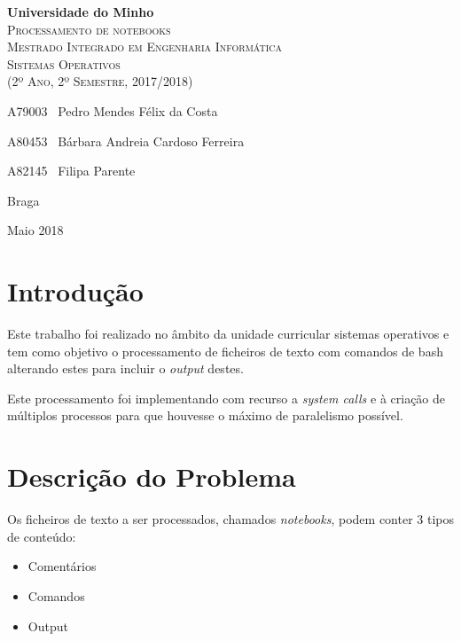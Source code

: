 \documentclass[12pt,a4paper]{report}
\begin{document}
\newcommand{\outputStart}[0]{$>>>$}
\newcommand{\outputEnd}[0]{$<<<$}

\begin{titlepage}
    \center
    {\huge {\bf Universidade do Minho}}\\[0.4cm]
    \vspace{3.0cm}
    \textsc{\huge{Processamento de notebooks}}\\[0.5cm]
    \vspace{3.0cm}
    \textsc{\huge{Mestrado Integrado em Engenharia Informática}}\\[0.5cm]
    \vspace{2.0cm}
    \textsc{Sistemas Operativos}\\[0.5cm]
    \textsc{(2º Ano, 2º Semestre, 2017/2018)}\\[0.5cm]
    \vspace{1.5cm}
    \begin{flushleft}
        A79003 \,\,\,Pedro Mendes Félix da Costa
        \vspace{0.2cm}

        A80453 \,\,\,Bárbara Andreia Cardoso Ferreira
        \vspace{0.2cm}

        A82145 \,\,\,Filipa Parente
    \end{flushleft}
        \vspace{1cm}
    \begin{flushright}
        Braga

        Maio 2018
    \end{flushright}

\end{titlepage}

\tableofcontents
\clearpage

\chapter{Introdução}
    Este trabalho foi realizado no âmbito da unidade curricular sistemas
    operativos e tem como objetivo o processamento de ficheiros de texto
    com comandos de bash alterando estes para incluir o \textit{output} destes.

    Este processamento foi implementando com recurso a \textit{system calls}
    e à criação de múltiplos processos para que houvesse o máximo de
    paralelismo possível.

\chapter{Descrição do Problema}
    Os ficheiros de texto a ser processados, chamados \textit{notebooks}, podem
    conter 3 tipos de conteúdo:
    \begin{itemize}
        \item Comentários
        \item Comandos
        \item Output
    \end{itemize}
\end{document}
